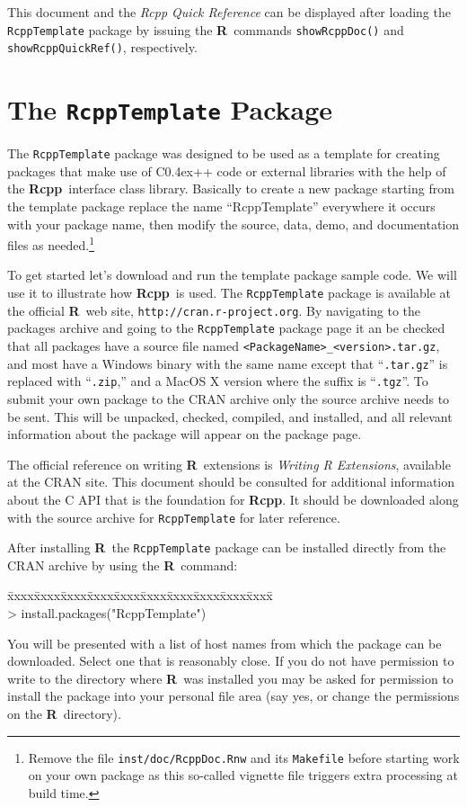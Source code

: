 \documentclass{article}
\newenvironment{program}{\ttfamily\begin{tabbing}
\=xxxx\=xxxx\=xxxx\=xxxx\=xxxx\=xxxx\=xxxx\=xxxx\=xxxx\=xxxx\= \+ \kill \\
}{\end{tabbing}}
\def\C++{C{\raise 0.4ex\hbox{\tiny ++}}}
\newcommand{\R}{{\bf R}}
\newcommand{\Rcpp}{{\bf Rcpp}}
\begin{document}
This document and the \emph{Rcpp Quick Reference} can be displayed after
loading the {\tt RcppTemplate} package by issuing the \R\ commands
{\tt showRcppDoc()} and {\tt showRcppQuickRef()}, respectively.

\section{The {\tt RcppTemplate} Package}

The {\tt RcppTemplate} package was designed to be used as a template for
creating packages that make use of \C++ code or external libraries with
the help of the \Rcpp\ interface class library. Basically to create a
new package starting from the template package 
replace the name ``RcppTemplate''
everywhere it occurs with your package name, then modify the 
source, data, demo, and documentation files as needed.\footnote{Remove the
file {\tt inst/doc/RcppDoc.Rnw} and its {\tt Makefile}
before starting work on your own package as this
so-called vignette file triggers extra processing at build time.}

To get started let's download and
run the template package sample code. We will use it to illustrate
how \Rcpp\ is used.
The {\tt RcppTemplate} package is
available at the official \R\ web site,
{\tt http://cran.r-project.org}. By navigating to the packages archive and
going to the {\tt RcppTemplate} package page it an be checked that all
packages have a source file
named {\tt <PackageName>\_<version>.tar.gz}, and most
have a Windows binary with the same name except that ``{\tt .tar.gz}''
is replaced with ``{\tt .zip},'' and a MacOS X version where the suffix
is ``{\tt .tgz}''. To submit your own package to the CRAN archive only
the source archive needs to be sent. This will be unpacked, checked,
compiled, and installed, and all relevant information about the package
will appear on the package page.

The official reference on writing \R\ extensions is
\emph{Writing R Extensions}, available at the CRAN site.
This document should be consulted for additional
information about the C API that is the foundation for \Rcpp. It should be
downloaded along with the source archive for {\tt RcppTemplate} for
later reference.

After installing \R\ the {\tt RcppTemplate} package can be installed
directly from the CRAN archive by using the \R\ command:
\begin{program}
> install.packages("RcppTemplate")
\end{program}
You will be presented with a list of host names from which the package
can be downloaded. Select one that is reasonably close. If you do not
have permission to write to the directory where \R\ was installed you
may be asked for permission to install the package into your personal
file area (say yes, or change the permissions on the \R\ directory).
\end{document}
